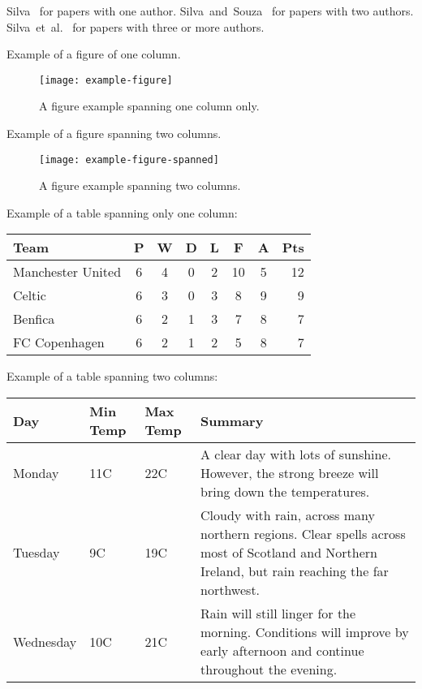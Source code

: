 \documentclass[10pt,twocolumn,letterpaper]{article}
\newcommand{\CITEONE}[2]{\mbox{#1 \cite{#2}}}
\newcommand{\CITETWO}[3]{\mbox{#1 and #2 \cite{#3}}}
\newcommand{\CITEN}[2]{\mbox{#1 et al. \cite{#2}}}
\begin{document}
\CITEONE{Silva}{Silva_2010} for papers with one author.
\CITETWO{Silva}{Souza}{Silva_2010b} for papers with two authors.
\CITEN{Silva}{Silva_2010c} for papers with three or more authors.

Example of a figure of one column. 
\begin{figure}
\begin{center}
	\texttt{[image: example-figure]}
	\caption{A figure example spanning one column only.\label{fig:label}}   
\end{center} 
\end{figure}   

Example of a figure spanning two columns. 
\begin{figure*}
\begin{center}
	\texttt{[image: example-figure-spanned]}
	\caption{A figure example spanning two columns.\label{fig:label2}}   
\end{center} 
\end{figure*}

Example of a table spanning only one column: 

\begin{table}
\begin{center}
\begin{tabular}{l*{6}{c}r}
Team              & P & W & D & L & F  & A & Pts \\
\hline
Manchester United & 6 & 4 & 0 & 2 & 10 & 5 & 12  \\
Celtic            & 6 & 3 & 0 & 3 &  8 & 9 &  9  \\
Benfica           & 6 & 2 & 1 & 3 &  7 & 8 &  7  \\
FC Copenhagen     & 6 & 2 & 1 & 2 &  5 & 8 &  7  \\
\end{tabular}
\end{center}
\end{table}

Example of a table spanning two columns: 

\begin{table*}
\begin{center}
    \begin{tabular}{ | l | l | l | p{8cm} |}
    \hline
    Day & Min Temp & Max Temp & Summary \\ \hline
    Monday & 11C & 22C & A clear day with lots of sunshine.  
    However, the strong breeze will bring down the temperatures. \\ \hline
    Tuesday & 9C & 19C & Cloudy with rain, across many northern regions. Clear spells
    across most of Scotland and Northern Ireland,
    but rain reaching the far northwest. \\ \hline
    Wednesday & 10C & 21C & Rain will still linger for the morning.
    Conditions will improve by early afternoon and continue
    throughout the evening. \\
    \hline
    \end{tabular}
\end{center}    
\end{table*}
\end{document}
